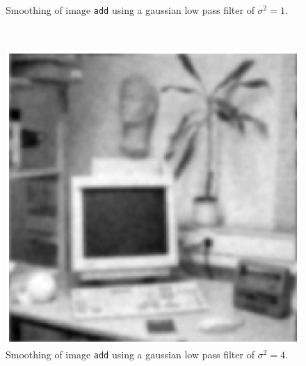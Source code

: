 \begin{minipage}{\linewidth}
\begin{minipage}{0.4\linewidth}
\begin{figure}[H]
      \caption{Smoothing of image \texttt{add} using a gaussian low pass filter of $\sigma^2 = 1$.}
      \label{fig:Q17_discgaussfft_add_1}
    \end{figure}
  \end{minipage}
\end{minipage}
\\

\begin{minipage}{\linewidth}
  \begin{minipage}{0.4\linewidth}
    \begin{figure}[H]
      \includegraphics[scale=0.6]{./images/Q17/discgaussfft/add_4.eps}
      \caption{Smoothing of image \texttt{add} using a gaussian low pass filter of $\sigma^2 = 4$.}
      \label{fig:Q17_discgaussfft_add_4}
    \end{figure}
  \end{minipage}
  \hspace{0.05\linewidth}
  \begin{minipage}{0.4\linewidth}
    \begin{figure}[H]

\end{figure}
\end{minipage}
\end{minipage}
